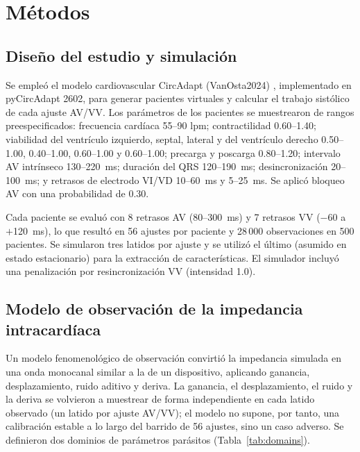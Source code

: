 \documentclass[11pt,a4paper]{article}
\begin{document}
\section{Métodos}

\subsection{Diseño del estudio y simulación}

Se empleó el modelo cardiovascular CircAdapt (VanOsta2024)
\citep{vanosta2024}, implementado en pyCircAdapt 2602, para generar pacientes
virtuales y calcular el trabajo sistólico de cada ajuste AV/VV. Los parámetros de
los pacientes se muestrearon de rangos preespecificados: frecuencia cardíaca
55--90 lpm; contractilidad 0.60--1.40; viabilidad del ventrículo izquierdo,
septal, lateral y del ventrículo derecho 0.50--1.00, 0.40--1.00, 0.60--1.00 y
0.60--1.00; precarga y poscarga 0.80--1.20; intervalo AV intrínseco 130--220~ms;
duración del QRS 120--190~ms; desincronización 20--100~ms; y retrasos de electrodo
VI/VD 10--60~ms y 5--25~ms. Se aplicó bloqueo AV con una probabilidad de 0.30.

Cada paciente se evaluó con 8 retrasos AV (80--300~ms) y 7 retrasos VV
($-$60 a $+$120~ms), lo que resultó en 56 ajustes por paciente y 28\,000
observaciones en 500 pacientes. Se simularon tres latidos por ajuste y se utilizó
el último (asumido en estado estacionario) para la extracción de características.
El simulador incluyó una penalización por resincronización VV (intensidad 1.0).

\subsection{Modelo de observación de la impedancia intracardíaca}

Un modelo fenomenológico de observación convirtió la impedancia simulada en una
onda monocanal similar a la de un dispositivo, aplicando ganancia,
desplazamiento, ruido aditivo y deriva. La ganancia, el desplazamiento, el ruido
y la deriva se volvieron a muestrear de forma independiente en cada latido
observado (un latido por ajuste AV/VV); el modelo no supone, por tanto, una
calibración estable a lo largo del barrido de 56 ajustes, sino un caso adverso.
Se definieron dos dominios de parámetros parásitos (Tabla~\ref{tab:domains}).
\end{document}
